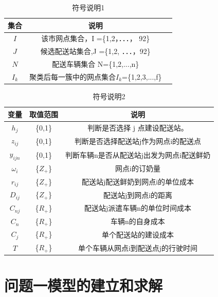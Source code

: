 \documentclass[withoutpreface,bwprint]{cumcmthesis} %
\begin{document}
\begin{table}[H]
	\centering
	\renewcommand{\arraystretch}{1.1}
	\setlength{\tabcolsep}{38pt}  %
	\caption{符号说明1}
	\begin{tabular}{ccl}
		\toprule
		集合    &说明    \\
		\midrule
		$I$ & 该市网点集合，I =\{1,2，．．．， 92\}\\
		$J$ & 候选配送站集合,J =\{1,2, ．．．，92\} \\
		$N$ & 配送车辆集合   N=\{1,2,...,n\}\\
		$I_k$&聚类后每一簇中的网点集合$I_k$=\{1,2,3,...,f\}\\
		\bottomrule
	\end{tabular}
	\label{tab:符号说明1}
\end{table}
\begin{table}[H]
	\centering
	\renewcommand{\arraystretch}{1.1}
	\setlength{\tabcolsep}{21pt}  %
	\caption{符号说明2}
	\begin{tabular}{ccc} 
		\toprule
		变量    & 取值范围 & 说明 \\
		\midrule
		$h_j$       &\{0,1\}  & 判断是否选择 j 点建设配送站。 \\
		$z_{ij}$    &\{0,1\}  &判断是否选择配送站j作为网点i的配送点 \\
		$y_{ijn}$   &\{0,1\}  &判断车辆n是否从配送站j出发为网点i配送鲜奶\\
		$\omega _i$ &\{$Z_+$\}&网点i的订奶量\\
		$r_{ij}$    &\{$Z_+$\}&配送站j配送鲜奶到网点i的单位成本\\
		$D_{ij}$    &\{$Z_+$\}&配送站j到网点i的距离\\
		$C_{nj}$    &\{$R_+$\}&配送站j派遣车辆n的单位时间成本\\
		$C_n$       &\{$R_+$\}&车辆n的自身成本\\
		$C_j$		&\{$R_+$\}&单个配送站的建设成本\\
		$T$         &\{$R_+$\}&单个车辆从网点i到配送点j的行驶时间\\
		\bottomrule
	\end{tabular}
	\label{tab:符号说明}
\end{table}
	
	
	
	



	
	
	\section{问题一模型的建立和求解}
\end{document}
